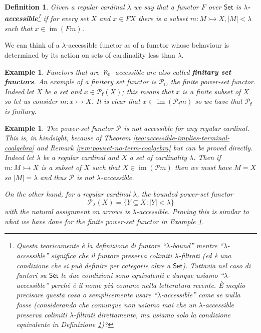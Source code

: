 \documentclass[letterpaper, 11pt, oneside]{memoir}
\theoremstyle{myteo}
\newtheorem{definition}[theorem]{Definition}
\newtheorem{example}[theorem]{Example}
\numberwithin{equation}{section}
\newcommand{\Set}{\textsf{Set}}
\DeclareMathOperator{\im}{im}
\begin{document}
\begin{definition}
  \label{def:accessible}
  Given a regular cardinal \(\lambda\) we say that a functor \(F\) over \(\Set\) is \textbf{\(\lambda\)-accessible}\footnote{\color{teal} Questa teoricamente è la definizione di funtore ``\(\lambda\)-bound'' mentre ``\(\lambda\)-accessible'' significa che il funtore preserva colimiti \(\lambda\)-filtrati (ed è una condizione che si può definire per categorie oltre a \(\Set\)). Tuttavia nel caso di funtori su \(\Set\) le due condizioni sono equivalenti e dunque usiamo ``\(\lambda\)-accessible'' perché è il nome più comune nella letteratura recente. È meglio precisare questa cosa o semplicemente usare ``\(\lambda\)-accessible'' come se nulla fosse (considerando che comunque non usiamo mai che un \(\lambda\)-accessible preserva colimiti \(\lambda\)-filtrati direttamente, ma usiamo solo la condizione equivalente in Definizione \ref{def:accessible})?} if for every set \(X\) and \(x \in FX\) there is a subset \(m : M \rightarrowtail X, |M| < \lambda\) such that \(x \in \im (Fm)\).
\end{definition}

We can think of a \(\lambda\)-accessible functor as of a functor whose behaviour is determined by its action on sets of cardinality less than \(\lambda\).

\begin{example}
  \label{ex:finitepowset}
  Functors that are \(\aleph_0\)-accessible are also called \textbf{finitary set functors}.
  An example of a finitary set functor is \(\mathcal{P}_{\textsf{f}}\), the finite power-set functor.
  Indeed let \(X\) be a set and \(x \in \mathcal{P}_{\textsf{f}}(X)\); this means that \(x\) is a finite subset of \(X\) so let us consider \(m : x \rightarrowtail X\).
  It is clear that \(x \in \im(\mathcal{P}_{\textsf{f}}m)\) so we have that \(\mathcal{P}_{\textsf{f}}\) is finitary.
\end{example}

\begin{example}
  \label{ex:powerset_lambda}
  The power-set functor \(\mathcal{P}\) is not accessible for any regular cardinal.
  This is, in hindsight, because of Theorem \ref{teo:accessible-implies-terminal-coalgebra} and Remark \ref{rem:powset-no-term-coalgebra} but can be proved directly.
  Indeed let \(\lambda\) be a regular cardinal and \(X\) a set of cardinality \(\lambda\).
  Then if \(m: M \rightarrowtail X\) is a subset of \(X\) such that \(X \in \im(\mathcal{P}m)\) then we must have \(M = X\) so \(|M| = \lambda\) and thus \(\mathcal{P}\) is not \(\lambda\)-accessible.

  On the other hand, for a regular cardinal \(\lambda\), the bounded power-set functor
  \begin{equation*}
    \mathcal{P}_\lambda(X) = \{Y \subseteq X : |Y| < \lambda\}
  \end{equation*}
  with the natural assignment on arrows is \(\lambda\)-accessible.
  Proving this is similar to what we have done for the finite power-set functor in Example \ref{ex:finitepowset}.
\end{example}
\end{document}
